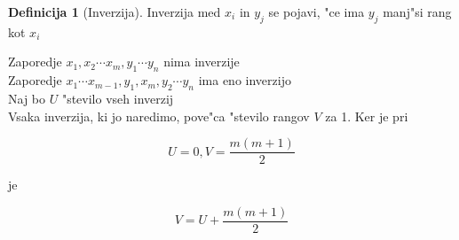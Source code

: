 \documentclass[a4paper,12pt]{article}
\theoremstyle{definition}
\newtheorem{defn}[counter]{Definicija}
\theoremstyle{remark}
\begin{document}
\begin{defn}[Inverzija]
    Inverzija med $x_i$ in $y_j$ se pojavi, "ce ima $y_j$ manj"si rang kot $x_i$
\end{defn}

Zaporedje $x_1, x_2 \cdots x_m, y_1 \cdots y_n$ nima inverzije \\
Zaporedje $x_1 \cdots x_{m-1}, y_1, x_m, y_2 \cdots y_n$ ima eno inverzijo \\
Naj bo $U$ "stevilo vseh inverzij \\
Vsaka inverzija, ki jo naredimo, pove"ca "stevilo rangov $V$ za 1. Ker je pri

\begin{equation*}
    U = 0, V = \frac{m(m+1)}{2}
\end{equation*}

je

\begin{equation*}
    V = U + \frac{m(m+1)}{2}
\end{equation*}
\end{document}
